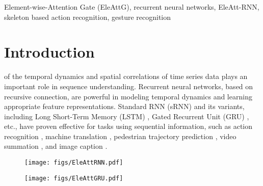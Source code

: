 \documentclass[journal]{IEEEtran}
\newcommand{\Outer}{Element-wise}
\begin{document}
\begin{IEEEkeywords}
	\Outer-Attention Gate (EleAttG), recurrent neural networks, EleAtt-RNN,  skeleton based action recognition, gesture recognition
\end{IEEEkeywords}
\IEEEpeerreviewmaketitle
\section{Introduction}

 of the temporal dynamics and spatial correlations of time series data plays an important role in sequence understanding. Recurrent neural networks, based on recursive connection, are powerful in modeling temporal dynamics and learning appropriate feature representations. Standard RNN (sRNN) and its variants, including Long Short-Term Memory (LSTM) \cite{hochreiter1997long}, Gated Recurrent Unit (GRU) \cite{cho14}, etc., have proven effective for tasks using sequential information, such as action recognition \cite{du2015hierarchical}, machine translation \cite{cho14},  pedestrian trajectory prediction \cite{zhang2019sr}, video summation \cite{zhao2018hsa}, and image caption \cite{vinyals2015show}.

\begin{figure*}[!t]
	\centering
	\begin{subfigure}[t]{0.4\linewidth}
		\centering\texttt{[image: figs/EleAttRNN.pdf]}
		\caption{}
		\label{subfig:generalRNN}
	\end{subfigure}	
	\hfil
	\begin{subfigure}[t]{0.45\linewidth}
		\centering\texttt{[image: figs/EleAttGRU.pdf]}
		\caption{}			
		\label{subfig:EleGGRU}
	\end{subfigure}
	\caption[]{Illustration of \Outer-Attention Gate (EleAttG) (marked in red) for (a) a generic RNN block, where the RNN structure could be the standard RNN, LSTM, or GRU and (b) a GRU block which consists of a group of ({\it e.g.,} ) GRU neurons. In the diagram, each line carries a vector. The brown circles denote element-wise operation, {\it e.g.,} element-wise vector product or vector addition. The yellow boxes denote the units of the original GRU with the output dimension of . The red box denotes the EleAttG with an output dimension of , which is the same as the dimension of the input .}\label{fig:IAttRNN}
\end{figure*}
\end{document}

